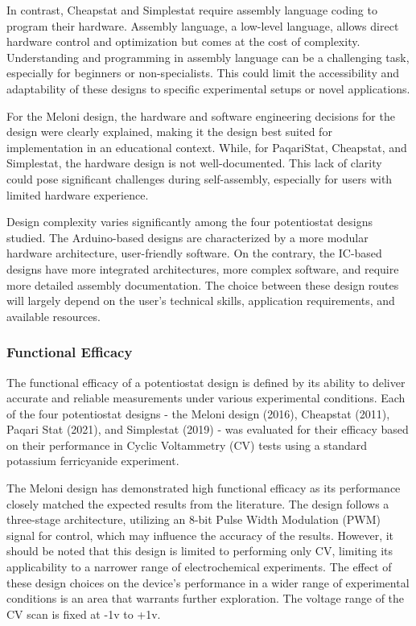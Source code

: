\documentclass{article}
\begin{document}
In contrast, Cheapstat and Simplestat require assembly language coding to program their hardware. Assembly language, a low-level language, allows direct hardware control and optimization but comes at the cost of complexity. Understanding and programming in assembly language can be a challenging task, especially for beginners or non-specialists. This could limit the accessibility and adaptability of these designs to specific experimental setups or novel applications.

For the Meloni design, the hardware and software engineering decisions for the design were clearly explained, making it the design best suited for implementation in an educational context. While, for PaqariStat, Cheapstat, and Simplestat, the hardware design is not well-documented. This lack of clarity could pose significant challenges during self-assembly, especially for users with limited hardware experience. 

Design complexity varies significantly among the four potentiostat designs studied. The Arduino-based designs are characterized by a more modular hardware architecture, user-friendly software. On the contrary, the IC-based designs have more integrated architectures, more complex software, and require more detailed assembly documentation. The choice between these design routes will largely depend on the user's technical skills, application requirements, and available resources.

\subsubsection*{Functional Efficacy}
The functional efficacy of a potentiostat design is defined by its ability to deliver accurate and reliable measurements under various experimental conditions. Each of the four potentiostat designs - the Meloni design (2016), Cheapstat (2011), Paqari Stat (2021), and Simplestat (2019) - was evaluated for their efficacy based on their performance in Cyclic Voltammetry (CV) tests using a standard potassium ferricyanide experiment.

The Meloni design has demonstrated high functional efficacy as its performance closely matched the expected results from the literature. The design follows a three-stage architecture, utilizing an 8-bit Pulse Width Modulation (PWM) signal for control, which may influence the accuracy of the results. However, it should be noted that this design is limited to performing only CV, limiting its applicability to a narrower range of electrochemical experiments. The effect of these design choices on the device's performance in a wider range of experimental conditions is an area that warrants further exploration. The voltage range of the CV scan is fixed at -1v to +1v.
\end{document}
